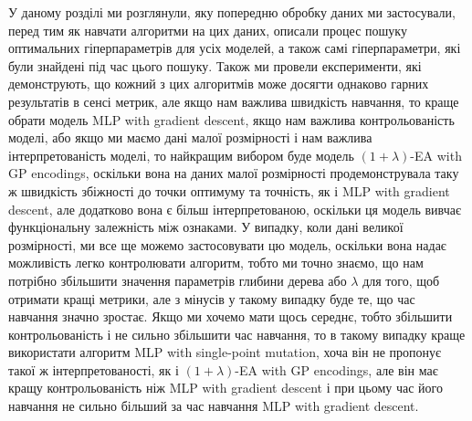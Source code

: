 \chapconclude{\ref{chap:practice}}

У даному розділі ми розглянули, яку попередню обробку даних ми застосували, перед тим як навчати алгоритми на цих даних, описали процес пошуку оптимальних гіперпараметрів для усіх моделей, а також самі гіперпараметри, які були знайдені під час цього пошуку. Також ми провели експерименти, які демонструють, що кожний з цих алгоритмів може досягти однаково гарних результатів в сенсі метрик, але якщо нам важлива швидкість навчання, то краще обрати модель MLP with gradient descent, якщо нам важлива контрольованість моделі, або якщо ми маємо дані малої розмірності і нам важлива інтерпретованість моделі, то найкращим вибором буде модель $(1+\lambda)$-EA with GP encodings, оскільки вона на даних малої розмірності продемонструвала таку ж швидкість збіжності до точки оптимуму та точність, як і MLP with gradient descent, але додатково вона є більш інтерпретованою, оскільки ця модель вивчає функціональну залежність між ознаками. У випадку, коли дані великої розмірності, ми все ще можемо застосовувати цю модель, оскільки вона надає можливість легко контролювати алгоритм, тобто ми точно знаємо, що нам потрібно збільшити значення параметрів глибини дерева або $\lambda$ для того, щоб отримати кращі метрики, але з мінусів у такому випадку буде те, що час навчання значно зростає. Якщо ми хочемо мати щось середнє, тобто збільшити контрольованість і не сильно збільшити час навчання, то в такому випадку краще використати алгоритм MLP with single-point mutation, хоча він не пропонує такої ж інтерпретованості, як і $(1+\lambda)$-EA with GP encodings, але він має кращу контрольованість ніж MLP with gradient descent і при цьому час його навчання не сильно більший за час навчання MLP with gradient descent.